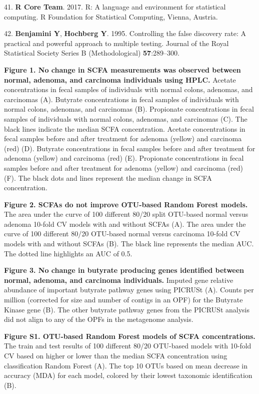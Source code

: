 \documentclass[11pt,]{article}
\begin{document}
\hypertarget{ref-r_citation_2017}{}
41. \textbf{R Core Team}. 2017. R: A language and environment for
statistical computing. R Foundation for Statistical Computing, Vienna,
Austria.

\hypertarget{ref-benjamini_controlling_1995}{}
42. \textbf{Benjamini Y}, \textbf{Hochberg Y}. 1995. Controlling the
false discovery rate: A practical and powerful approach to multiple
testing. Journal of the Royal Statistical Society Series B
(Methodological) \textbf{57}:289--300.

\newpage

\textbf{Figure 1. No change in SCFA measurements was observed between
normal, adenoma, and carcinoma individuals using HPLC.} Acetate
concentrations in fecal samples of individuals with normal colons,
adenomas, and carcinomas (A). Butyrate concentrations in fecal samples
of individuals with normal colons, adenomas, and carcinomas (B).
Propionate concentrations in fecal samples of individuals with normal
colons, adenomas, and carcinomas (C). The black lines indicate the
median SCFA concentration. Acetate concentrations in fecal samples
before and after treatment for adenoma (yellow) and carcinoma (red) (D).
Butyrate concentrations in fecal samples before and after treatment for
adenoma (yellow) and carcinoma (red) (E). Propionate concentrations in
fecal samples before and after treatment for adenoma (yellow) and
carcinoma (red) (F). The black dots and lines represent the median
change in SCFA concentration.

\textbf{Figure 2. SCFAs do not improve OTU-based Random Forest models.}
The area under the curve of 100 different 80/20 split OTU-based normal
versus adenoma 10-fold CV models with and without SCFAs (A). The area
under the curve of 100 different 80/20 OTU-based normal versus carcinoma
10-fold CV models with and without SCFAs (B). The black line represents
the median AUC. The dotted line highlights an AUC of 0.5.

\textbf{Figure 3. No change in butyrate producing genes identified
between normal, adenoma, and carcinoma individuals.} Imputed gene
relative abundance of important butyrate pathway genes using PICRUSt
(A). Counts per million (corrected for size and number of contigs in an
OPF) for the Butyrate Kinase gene (B). The other butyrate pathway genes
from the PICRUSt analysis did not align to any of the OPFs in the
metagenome analysis.

\newpage

\textbf{Figure S1. OTU-based Random Forest models of SCFA
concentrations.} The train and test results of 100 different 80/20
OTU-based models with 10-fold CV based on higher or lower than the
median SCFA concentration using classification Random Forest (A). The
top 10 OTUs based on mean decrease in accuracy (MDA) for each model,
colored by their lowest taxonomic identification (B).
\end{document}
